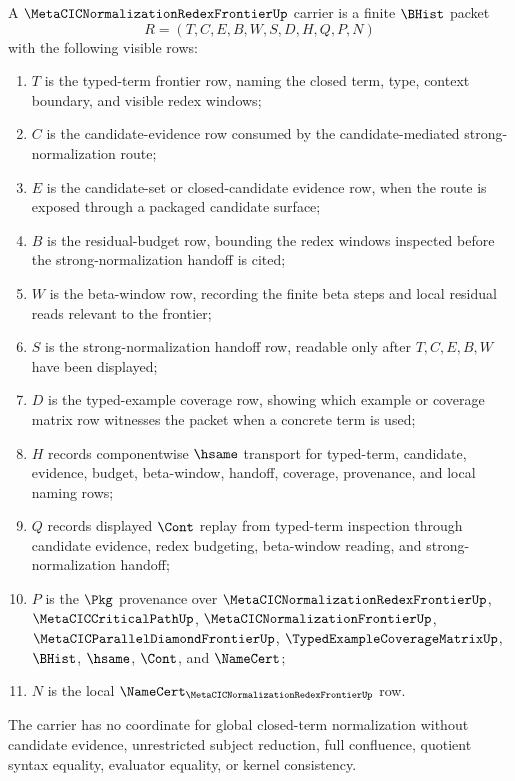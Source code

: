 \begin{definition}
\label{def:metacic-normalization-redex-frontier-carrier}
A $\MetaCICNormalizationRedexFrontierUp$ carrier is a finite $\BHist$ packet
$$
R=(T,C,E,B,W,S,D,H,Q,P,N)
$$
with the following visible rows:
\begin{enumerate}
\item $T$ is the typed-term frontier row, naming the closed term, type, context boundary, and visible redex windows;
\item $C$ is the candidate-evidence row consumed by the candidate-mediated strong-normalization route;
\item $E$ is the candidate-set or closed-candidate evidence row, when the route is exposed through a packaged candidate surface;
\item $B$ is the residual-budget row, bounding the redex windows inspected before the strong-normalization handoff is cited;
\item $W$ is the beta-window row, recording the finite beta steps and local residual reads relevant to the frontier;
\item $S$ is the strong-normalization handoff row, readable only after $T,C,E,B,W$ have been displayed;
\item $D$ is the typed-example coverage row, showing which example or coverage matrix row witnesses the packet when a concrete term is used;
\item $H$ records componentwise $\hsame$ transport for typed-term, candidate, evidence, budget, beta-window, handoff, coverage, provenance, and local naming rows;
\item $Q$ records displayed $\Cont$ replay from typed-term inspection through candidate evidence, redex budgeting, beta-window reading, and strong-normalization handoff;
\item $P$ is the $\Pkg$ provenance over $\MetaCICNormalizationRedexFrontierUp$, $\MetaCICCriticalPathUp$, $\MetaCICNormalizationFrontierUp$, $\MetaCICParallelDiamondFrontierUp$, $\TypedExampleCoverageMatrixUp$, $\BHist$, $\hsame$, $\Cont$, and $\NameCert$;
\item $N$ is the local $\NameCert_{\MetaCICNormalizationRedexFrontierUp}$ row.
\end{enumerate}
The carrier has no coordinate for global closed-term normalization without candidate evidence, unrestricted subject reduction, full confluence, quotient syntax equality, evaluator equality, or kernel consistency.
\end{definition}

